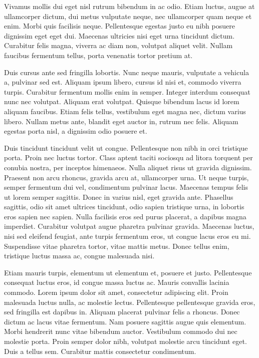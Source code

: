 \documentclass[2pt,a4paper,twoside ]{article}
\begin{document}
\begin{multicols}{2}
Vivamus mollis dui eget nisl rutrum bibendum in ac odio. Etiam luctus, augue at ullamcorper dictum, dui metus vulputate neque, nec ullamcorper quam neque et enim. Morbi quis facilisis neque. Pellentesque egestas justo eu nibh posuere dignissim eget eget dui. Maecenas ultricies nisi eget urna tincidunt dictum. Curabitur felis magna, viverra ac diam non, volutpat aliquet velit. Nullam faucibus fermentum tellus, porta venenatis tortor pretium at.

Duis cursus ante sed fringilla lobortis. Nunc neque mauris, vulputate a vehicula a, pulvinar sed est. Aliquam ipsum libero, cursus id nisi et, commodo viverra turpis. Curabitur fermentum mollis enim in semper. Integer interdum consequat nunc nec volutpat. Aliquam erat volutpat. Quisque bibendum lacus id lorem aliquam faucibus. Etiam felis tellus, vestibulum eget magna nec, dictum varius libero. Nullam metus ante, blandit eget auctor in, rutrum nec felis. Aliquam egestas porta nisl, a dignissim odio posuere et.

Duis tincidunt tincidunt velit ut congue. Pellentesque non nibh in orci tristique porta. Proin nec luctus tortor. Class aptent taciti sociosqu ad litora torquent per conubia nostra, per inceptos himenaeos. Nulla aliquet risus ut gravida dignissim. Praesent non arcu rhoncus, gravida arcu at, ullamcorper urna. Ut neque turpis, semper fermentum dui vel, condimentum pulvinar lacus. Maecenas tempus felis ut lorem semper sagittis. Donec in varius nisl, eget gravida ante. Phasellus sagittis, odio sit amet ultrices tincidunt, odio sapien tristique urna, in lobortis eros sapien nec sapien. Nulla facilisis eros sed purus placerat, a dapibus magna imperdiet. Curabitur volutpat augue pharetra pulvinar gravida. Maecenas luctus, nisi sed eleifend feugiat, ante turpis fermentum eros, ut congue lacus eros eu mi. Suspendisse vitae pharetra tortor, vitae mattis metus. Donec tellus enim, tristique luctus massa ac, congue malesuada nisi.

Etiam mauris turpis, elementum ut elementum et, posuere et justo. Pellentesque consequat luctus eros, id congue massa luctus ac. Mauris convallis lacinia commodo. Lorem ipsum dolor sit amet, consectetur adipiscing elit. Proin malesuada luctus nulla, ac molestie lectus. Pellentesque pellentesque gravida eros, sed fringilla est dapibus in. Aliquam placerat pulvinar felis a rhoncus. Donec dictum ac lacus vitae fermentum. Nam posuere sagittis augue quis elementum. Morbi hendrerit nunc vitae bibendum auctor. Vestibulum commodo dui nec molestie porta. Proin semper dolor nibh, volutpat molestie arcu tincidunt eget. Duis a tellus sem. Curabitur mattis consectetur condimentum.


\end{multicols}
\end{document}
